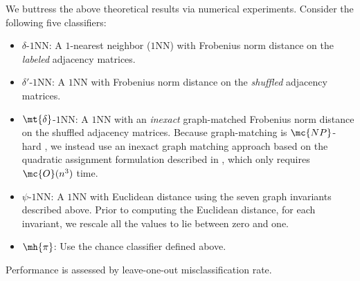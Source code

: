 \documentclass[10pt,journal,cspaper,compsoc]{IEEEtran}
\begin{document}
We buttress the above theoretical results via numerical experiments.  Consider the following five classifiers:
\begin{itemize}
	\item {$\delta$-$1$NN:}  A $1$-nearest neighbor ($1$NN) with Frobenius norm distance on the \emph{labeled} adjacency matrices.
	\item {$\delta'$-$1$NN:} A $1$NN with Frobenius norm distance on the \emph{shuffled} adjacency matrices.
	\item {$\mt{\delta}$-$1$NN:} A $1$NN with an \emph{inexact} graph-matched Frobenius norm distance on the shuffled adjacency matrices.  Because graph-matching is $\mc{NP}$-hard \cite{Garey1979}, we instead use an inexact graph matching approach based on the quadratic assignment formulation described in \cite{VP11_QAP}, which only requires $\mc{O}(n^3)$ time.
	\item {$\psi$-$1$NN:} A $1$NN with Euclidean distance using the seven graph invariants described above.  Prior to computing the Euclidean distance, for each invariant, we rescale all the values to lie between zero and one.
	\item {$\mh{\pi}$:} Use the chance classifier defined above.
\end{itemize}
Performance is assessed by leave-one-out misclassification rate.


% 
% 
\end{document}

